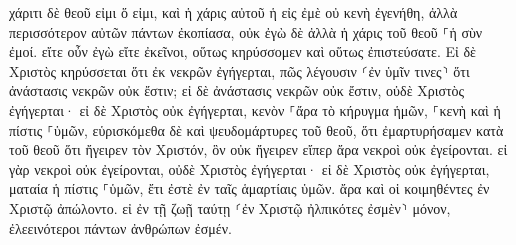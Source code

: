 \documentclass{openreader}
\begin{document}
χάριτι δὲ θεοῦ εἰμι ὅ εἰμι, καὶ ἡ χάρις αὐτοῦ ἡ εἰς ἐμὲ οὐ κενὴ ἐγενήθη, ἀλλὰ περισσότερον αὐτῶν πάντων ἐκοπίασα, οὐκ ἐγὼ δὲ ἀλλὰ ἡ χάρις τοῦ θεοῦ ⸀ἡ σὺν ἐμοί. 
εἴτε οὖν ἐγὼ εἴτε ἐκεῖνοι, οὕτως κηρύσσομεν καὶ οὕτως ἐπιστεύσατε. 
Εἰ δὲ Χριστὸς κηρύσσεται ὅτι ἐκ νεκρῶν ἐγήγερται, πῶς λέγουσιν ⸂ἐν ὑμῖν τινες⸃ ὅτι ἀνάστασις νεκρῶν οὐκ ἔστιν; 
εἰ δὲ ἀνάστασις νεκρῶν οὐκ ἔστιν, οὐδὲ Χριστὸς ἐγήγερται· 
εἰ δὲ Χριστὸς οὐκ ἐγήγερται, κενὸν ⸀ἄρα τὸ κήρυγμα ἡμῶν, ⸀κενὴ καὶ ἡ πίστις ⸀ὑμῶν, 
εὑρισκόμεθα δὲ καὶ ψευδομάρτυρες τοῦ θεοῦ, ὅτι ἐμαρτυρήσαμεν κατὰ τοῦ θεοῦ ὅτι ἤγειρεν τὸν Χριστόν, ὃν οὐκ ἤγειρεν εἴπερ ἄρα νεκροὶ οὐκ ἐγείρονται. 
εἰ γὰρ νεκροὶ οὐκ ἐγείρονται, οὐδὲ Χριστὸς ἐγήγερται· 
εἰ δὲ Χριστὸς οὐκ ἐγήγερται, ματαία ἡ πίστις ⸀ὑμῶν, ἔτι ἐστὲ ἐν ταῖς ἁμαρτίαις ὑμῶν. 
ἄρα καὶ οἱ κοιμηθέντες ἐν Χριστῷ ἀπώλοντο. 
εἰ ἐν τῇ ζωῇ ταύτῃ ⸂ἐν Χριστῷ ἠλπικότες ἐσμὲν⸃ μόνον, ἐλεεινότεροι πάντων ἀνθρώπων ἐσμέν. 
\end{document}
